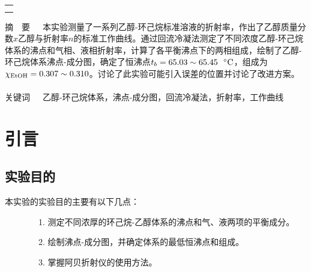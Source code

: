 \documentclass[12pt]{article}
\begin{document}
\begin{titlepage}
\begin{center}
            \begin{tabular*}{\textwidth}{c}
                \\ %
                \\ %
                \\ %
                \hline %
            \end{tabular*}
        \end{center}
        \textsf{\textcolor{BrickRed}{摘\ \ 要}}\ \  \  本实验测量了一系列乙醇-环己烷标准溶液的折射率，作出了乙醇质量分数$x$乙醇与折射率$n$的标准工作曲线。通过回流冷凝法测定了不同浓度乙醇-环己烷体系的沸点和气相、液相折射率，计算了各平衡沸点下的两相组成，绘制了乙醇-环己烷体系沸点-成分图，确定了恒沸点$t_{b}=65.03\sim 65.45\ \ {\rm ^{\circ}C}$，组成为$\chi_{\ce{EtOH}}=0.307 \sim 0.310$。讨论了此实验可能引入误差的位置并讨论了改进方案。
        \\
        \\
        \textsf{\textcolor{BrickRed}{关键词}}\ \ \  乙醇-环己烷体系，沸点-成分图，回流冷凝法，折射率，工作曲线
    \end{titlepage}

    \section{引言}
		\subsection{实验目的}
			本实验的实验目的主要有以下几点\citealp{physchemlab}：\par
			\ \ \ \ \ \ \ \ 1. 测定不同浓厚的环己烷-乙醇体系的沸点和气、液两项的平衡成分。\par
			\ \ \ \ \ \ \ \	2. 绘制沸点-成分图，并确定体系的最低恒沸点和组成。\par
			\ \ \ \ \ \ \ \	3. 掌握阿贝折射仪的使用方法。\par

		\par
\end{document}
